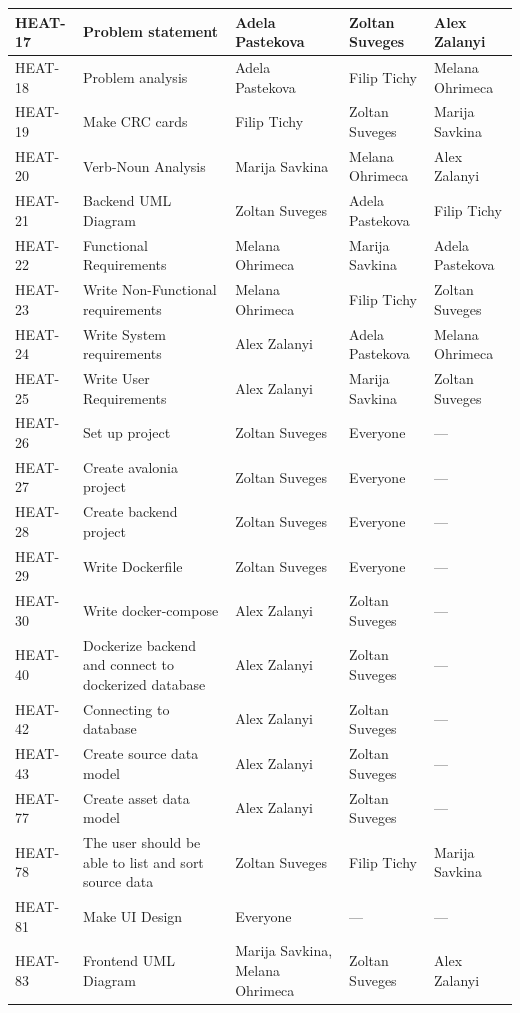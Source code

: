 \begin{longtable}{|p{1.5cm}|p{4.5cm}|p{2.8cm}|p{2.6cm}|p{2.6cm}|}
HEAT-17 & Problem statement & Adela Pastekova & Zoltan Suveges & Alex Zalanyi \\ \hline
HEAT-18 & Problem analysis & Adela Pastekova & Filip Tichy & Melana Ohrimeca \\ \hline
HEAT-19 & Make CRC cards & Filip Tichy & Zoltan Suveges & Marija Savkina \\ \hline
HEAT-20 & Verb-Noun Analysis & Marija Savkina & Melana Ohrimeca & Alex Zalanyi \\ \hline
HEAT-21 & Backend UML Diagram & Zoltan Suveges & Adela Pastekova & Filip Tichy \\ \hline
HEAT-22 & Functional Requirements & Melana Ohrimeca & Marija Savkina & Adela Pastekova \\ \hline
HEAT-23 & Write Non-Functional requirements & Melana Ohrimeca & Filip Tichy & Zoltan Suveges \\ \hline
HEAT-24 & Write System requirements & Alex Zalanyi & Adela Pastekova & Melana Ohrimeca \\ \hline
HEAT-25 & Write User Requirements & Alex Zalanyi & Marija Savkina & Zoltan Suveges \\ \hline
HEAT-26 & Set up project & Zoltan Suveges & Everyone & --- \\ \hline
HEAT-27 & Create avalonia project & Zoltan Suveges & Everyone & --- \\ \hline
HEAT-28 & Create backend project & Zoltan Suveges & Everyone & --- \\ \hline
HEAT-29 & Write Dockerfile & Zoltan Suveges & Everyone & --- \\ \hline
HEAT-30 & Write docker-compose & Alex Zalanyi & Zoltan Suveges & --- \\ \hline
HEAT-40 & Dockerize backend and connect to dockerized database & Alex Zalanyi & Zoltan Suveges & --- \\ \hline
HEAT-42 & Connecting to database & Alex Zalanyi & Zoltan Suveges & --- \\ \hline
HEAT-43 & Create source data model & Alex Zalanyi & Zoltan Suveges & --- \\ \hline
HEAT-77 & Create asset data model & Alex Zalanyi & Zoltan Suveges & --- \\ \hline
HEAT-78 & The user should be able to list and sort source data & Zoltan Suveges & Filip Tichy & Marija Savkina \\ \hline
HEAT-81 & Make UI Design & Everyone & --- & --- \\ \hline
HEAT-83 & Frontend UML Diagram & Marija Savkina, Melana Ohrimeca & Zoltan Suveges & Alex Zalanyi \\ \hline

\end{longtable}
